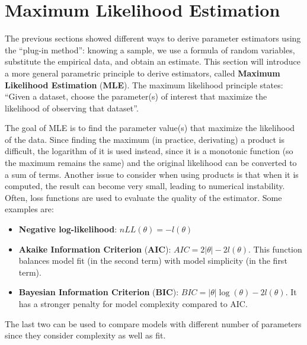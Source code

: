 \section{Maximum Likelihood Estimation}

The previous sections showed different ways to derive parameter estimators using the ``plug-in method'': knowing a sample, we use a formula of random variables, substitute the empirical data, and obtain an estimate. This section will introduce a more general parametric principle to derive estimators, called \textbf{Maximum Likelihood Estimation} (\textbf{MLE}). The maximum likelihood principle states: ``Given a dataset, choose the parameter(s) of interest that maximize the likelihood of observing that dataset''. 

The goal of MLE is to find the parameter value(s) that maximize the likelihood of the data. Since finding the maximum (in practice, derivating) a product is difficult, the logarithm of it is used instead, since it is a monotonic function (so the maximum remains the same) and the original likelihood can be converted to a sum of terms. Another issue to consider when using products is that when it is computed, the result can become very small, leading to numerical instability.
Often, loss functions are used to evaluate the quality of the estimator. Some examples are:
\begin{itemize}
    \item \textbf{Negative log-likelihood}: $nLL(\theta) = -l(\theta)$
    \item \textbf{Akaike Information Criterion} (\textbf{AIC}): $AIC = 2 |\theta| - 2 l(\theta)$. This function balances model fit (in the second term) with model simplicity (in the first term).
    \item \textbf{Bayesian Information Criterion} (\textbf{BIC}): $BIC = |\theta| \log(\theta) - 2 l(\theta)$. It has a stronger penalty for model complexity compared to AIC.
\end{itemize}
The last two can be used to compare models with different number of parameters since they consider complexity as well as fit.

